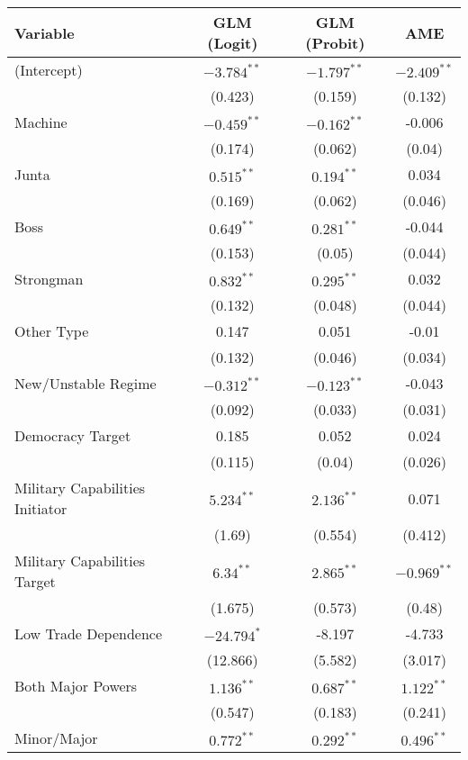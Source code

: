 \begin{table}[ht]
\centering
\begingroup\scriptsize
\begin{tabular}{lccc}
 Variable & GLM (Logit) & GLM (Probit) & AME \\ 
  \hline
\hline
(Intercept) & $-3.784^{\ast\ast}$ & $-1.797^{\ast\ast}$ & $-2.409^{\ast\ast}$ \\ 
   & (0.423) & (0.159) & (0.132) \\ 
  Machine & $-0.459^{\ast\ast}$ & $-0.162^{\ast\ast}$ & -0.006 \\ 
   & (0.174) & (0.062) & (0.04) \\ 
  Junta & $0.515^{\ast\ast}$ & $0.194^{\ast\ast}$ & 0.034 \\ 
   & (0.169) & (0.062) & (0.046) \\ 
  Boss & $0.649^{\ast\ast}$ & $0.281^{\ast\ast}$ & -0.044 \\ 
   & (0.153) & (0.05) & (0.044) \\ 
  Strongman & $0.832^{\ast\ast}$ & $0.295^{\ast\ast}$ & 0.032 \\ 
   & (0.132) & (0.048) & (0.044) \\ 
  Other Type & 0.147 & 0.051 & -0.01 \\ 
   & (0.132) & (0.046) & (0.034) \\ 
  New/Unstable Regime & $-0.312^{\ast\ast}$ & $-0.123^{\ast\ast}$ & -0.043 \\ 
   & (0.092) & (0.033) & (0.031) \\ 
  Democracy Target & 0.185 & 0.052 & 0.024 \\ 
   & (0.115) & (0.04) & (0.026) \\ 
  Military Capabilities Initiator & $5.234^{\ast\ast}$ & $2.136^{\ast\ast}$ & 0.071 \\ 
   & (1.69) & (0.554) & (0.412) \\ 
  Military Capabilities Target  & $6.34^{\ast\ast}$ & $2.865^{\ast\ast}$ & $-0.969^{\ast\ast}$ \\ 
   & (1.675) & (0.573) & (0.48) \\ 
  Low Trade Dependence  & $-24.794^{\ast}$ & -8.197 & -4.733 \\ 
   & (12.866) & (5.582) & (3.017) \\ 
  Both Major Powers & $1.136^{\ast\ast}$ & $0.687^{\ast\ast}$ & $1.122^{\ast\ast}$ \\ 
   & (0.547) & (0.183) & (0.241) \\ 
  Minor/Major & $0.772^{\ast\ast}$ & $0.292^{\ast\ast}$ & $0.496^{\ast\ast}$ \\ 

\end{tabular}
\end{table}
